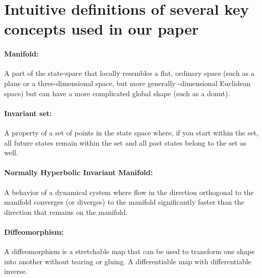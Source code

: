 \documentclass{article} %
\newcounter{ct}
\theoremstyle{definition}
\theoremstyle{remark}
\begin{document}
%


\section{Intuitive definitions of several key concepts used in our paper}\label{sec:supp:simplifications}

\paragraph{Manifold:} A part of the state-space that locally resembles a flat, ordinary space (such as a plane or a three-dimensional space, but more generally
-dimensional Euclidean space) but can have a more complicated global shape (such as a donut).\label{sec:supp:manifold}
\paragraph{Invariant set:} A property of a set of points in the state space where, if you start within the set, all future states remain within the set and all past states belong to the set as well.\label{sec:supp:invset}
\paragraph{Normally Hyperbolic Invariant Manifold:} A behavior of a dynamical system where flow in the direction orthogonal to the manifold converges (or diverges) to the manifold significantly faster than the direction that remains on the manifold.\label{sec:supp:nhim}
\paragraph{Diffeomorphism:} A diffeomorphism is a stretchable map that can be used to transform one shape into another without tearing or gluing.
A differentiable map with differentiable inverse.\label{sec:supp:diffeomorphism}
\end{document}
